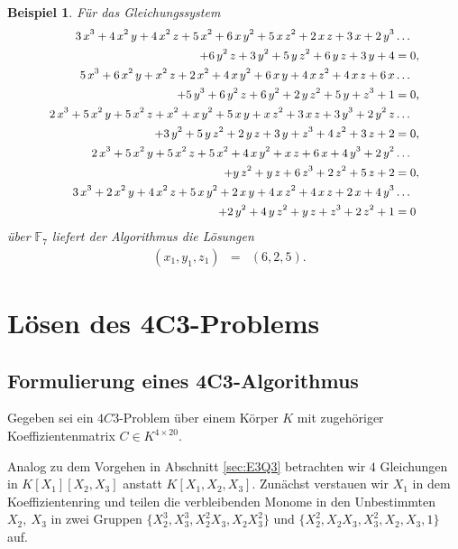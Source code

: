\documentclass[a4paper,oneside, 11pt, openany%
]{article}
\newcommand{\F}[1]{\mathbb{F}_{#1}}
\theoremstyle{custom}
\theoremstyle{custom}
\newtheorem{example}{Beispiel}[section]
\begin{document}
\begin{example}
	\label{ex:5C3_2}
	Für das Gleichungssystem
	\begin{equation*}\label{eqn:example5C3_2}
		\small
		\begin{alignedat}{1}
			3\,x^3+4\,x^2\,y+4\,x^2\,z+5\,x^2+6\,x\,y^2+5\,x\,z^2
			+2\,x\,z+3\,x+2\,y^3&\ldots\\
			+6\,y^2\,z+3\,y^2+5\,y\,z^2+6\,y\,z+3\,y+4&=0,\\ 5\,x^3+6\,x^2\,y+x^2\,z+2\,x^2+4\,x\,y^2+6\,x\,y+4\,x\,z^2
			+4\,x\,z+6\,x&\ldots\\
			+5\,y^3+6\,y^2\,z+6\,y^2+2\,y\,z^2+5\,y+z^3+1&=0,\\ 2\,x^3+5\,x^2\,y+5\,x^2\,z+x^2+x\,y^2+5\,x\,y+x\,z^2+3\,x\,z
			+3\,y^3+2\,y^2\,z&\ldots\\
			+3\,y^2+5\,y\,z^2+2\,y\,z+3\,y+z^3+4\,z^2+3\,z+2&=0,\\ 2\,x^3+5\,x^2\,y+5\,x^2\,z+5\,x^2+4\,x\,y^2+x\,z+6\,x
			+4\,y^3+2\,y^2&\ldots\\
			+y\,z^2+y\,z+6\,z^3+2\,z^2+5\,z+2&=0,\\ 3\,x^3+2\,x^2\,y+4\,x^2\,z+5\,x\,y^2+2\,x\,y+4\,x\,z^2
			+4\,x\,z+2\,x+4\,y^3&\ldots\\
			+2\,y^2+4\,y\,z^2+y\,z+z^3+2\,z^2+1&=0
		\end{alignedat}
	\end{equation*}
	über $\F{7}$ liefert der Algorithmus die Lösungen 
	\begin{equation*}
		\begin{alignedat}{5}
			&\left( x_{1},y_{1},z_{1}\right) &=& \left(6,2,5 \right).&&
		\end{alignedat}
	\end{equation*}
\end{example}
\newpage
\section{Lösen des 4C3-Problems}
\subsection{Formulierung eines 4C3-Algorithmus}\label{sec:4C3_alg}
Gegeben sei ein $4C3$-Problem über einem Körper $K$ mit zugehöriger Koeffizientenmatrix $C \in K^{4 \times 20}$.

Analog zu dem Vorgehen in Abschnitt \ref{sec:E3Q3} betrachten wir $4$ Gleichungen in $K\left[ X_{1}\right] \left[X_{2},X_{3}\right] $ anstatt $K\left[ X_{1},X_{2},X_{3}\right]$. Zunächst verstauen wir $X_{1}$ in dem Koeffizientenring und teilen die verbleibenden Monome in den Unbestimmten $X_{2},\ X_{3}$ in zwei Gruppen $\{X_{2}^3,X_{3}^3,X_{2}^2X_{3},X_{2}X_{3}^2\}$ und $\{X_{2}^2,X_{2}X_{3},X_{3}^2,X_{2},X_{3},1\}$ auf.
\end{document}
